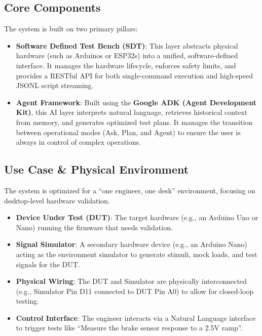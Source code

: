 \documentclass[conference]{IEEEtran}
\begin{document}
\subsection{Core Components}
The system is built on two primary pillars:
\begin{itemize}
    \item \textbf{Software Defined Test Bench (SDT)}: This layer abstracts physical hardware (such as Arduinos or ESP32s) into a unified, software-defined interface. It manages the hardware lifecycle, enforces safety limits, and provides a RESTful API for both single-command execution and high-speed JSONL script streaming.
    \item \textbf{Agent Framework}: Built using the \textbf{Google ADK (Agent Development Kit)}, this AI layer interprets natural language, retrieves historical context from memory, and generates optimized test plans. It manages the transition between operational modes (Ask, Plan, and Agent) to ensure the user is always in control of complex operations.
\end{itemize}

\subsection{Use Case \& Physical Environment}
The system is optimized for a ``one engineer, one desk'' environment, focusing on desktop-level hardware validation.
\begin{itemize}
    \item \textbf{Device Under Test (DUT)}: The target hardware (e.g., an Arduino Uno or Nano) running the firmware that needs validation.
    \item \textbf{Signal Simulator}: A secondary hardware device (e.g., an Arduino Nano) acting as the environment simulator to generate stimuli, mock loads, and test signals for the DUT.
    \item \textbf{Physical Wiring}: The DUT and Simulator are physically interconnected (e.g., Simulator Pin D11 connected to DUT Pin A0) to allow for closed-loop testing.
    \item \textbf{Control Interface}: The engineer interacts via a Natural Language interface to trigger tests like ``Measure the brake sensor response to a 2.5V ramp''.
\end{itemize}
\end{document}
